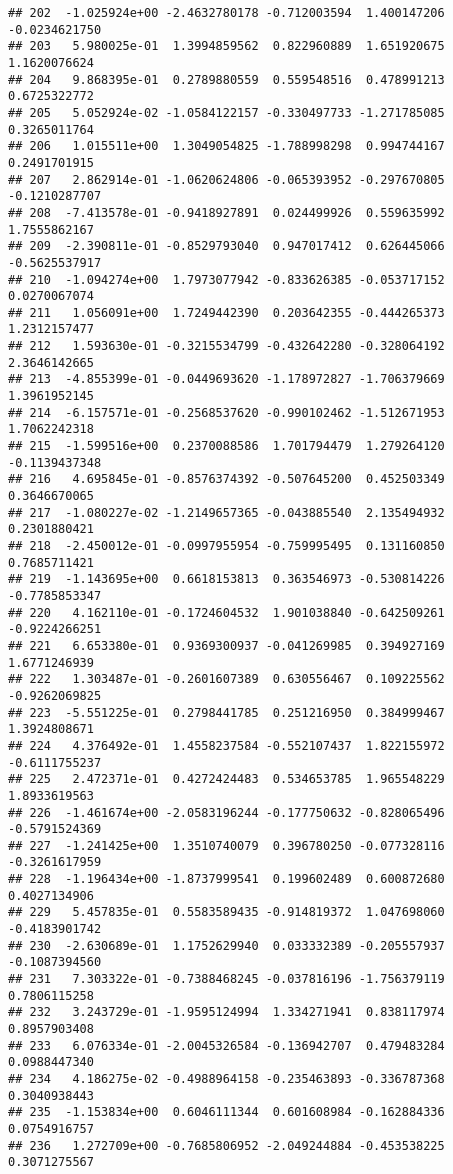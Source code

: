 \documentclass[
]{article}
\begin{document}
\begin{verbatim}
## 202  -1.025924e+00 -2.4632780178 -0.712003594  1.400147206 -0.0234621750
## 203   5.980025e-01  1.3994859562  0.822960889  1.651920675  1.1620076624
## 204   9.868395e-01  0.2789880559  0.559548516  0.478991213  0.6725322772
## 205   5.052924e-02 -1.0584122157 -0.330497733 -1.271785085  0.3265011764
## 206   1.015511e+00  1.3049054825 -1.788998298  0.994744167  0.2491701915
## 207   2.862914e-01 -1.0620624806 -0.065393952 -0.297670805 -0.1210287707
## 208  -7.413578e-01 -0.9418927891  0.024499926  0.559635992  1.7555862167
## 209  -2.390811e-01 -0.8529793040  0.947017412  0.626445066 -0.5625537917
## 210  -1.094274e+00  1.7973077942 -0.833626385 -0.053717152  0.0270067074
## 211   1.056091e+00  1.7249442390  0.203642355 -0.444265373  1.2312157477
## 212   1.593630e-01 -0.3215534799 -0.432642280 -0.328064192  2.3646142665
## 213  -4.855399e-01 -0.0449693620 -1.178972827 -1.706379669  1.3961952145
## 214  -6.157571e-01 -0.2568537620 -0.990102462 -1.512671953  1.7062242318
## 215  -1.599516e+00  0.2370088586  1.701794479  1.279264120 -0.1139437348
## 216   4.695845e-01 -0.8576374392 -0.507645200  0.452503349  0.3646670065
## 217  -1.080227e-02 -1.2149657365 -0.043885540  2.135494932  0.2301880421
## 218  -2.450012e-01 -0.0997955954 -0.759995495  0.131160850  0.7685711421
## 219  -1.143695e+00  0.6618153813  0.363546973 -0.530814226 -0.7785853347
## 220   4.162110e-01 -0.1724604532  1.901038840 -0.642509261 -0.9224266251
## 221   6.653380e-01  0.9369300937 -0.041269985  0.394927169  1.6771246939
## 222   1.303487e-01 -0.2601607389  0.630556467  0.109225562 -0.9262069825
## 223  -5.551225e-01  0.2798441785  0.251216950  0.384999467  1.3924808671
## 224   4.376492e-01  1.4558237584 -0.552107437  1.822155972 -0.6111755237
## 225   2.472371e-01  0.4272424483  0.534653785  1.965548229  1.8933619563
## 226  -1.461674e+00 -2.0583196244 -0.177750632 -0.828065496 -0.5791524369
## 227  -1.241425e+00  1.3510740079  0.396780250 -0.077328116 -0.3261617959
## 228  -1.196434e+00 -1.8737999541  0.199602489  0.600872680  0.4027134906
## 229   5.457835e-01  0.5583589435 -0.914819372  1.047698060 -0.4183901742
## 230  -2.630689e-01  1.1752629940  0.033332389 -0.205557937 -0.1087394560
## 231   7.303322e-01 -0.7388468245 -0.037816196 -1.756379119  0.7806115258
## 232   3.243729e-01 -1.9595124994  1.334271941  0.838117974  0.8957903408
## 233   6.076334e-01 -2.0045326584 -0.136942707  0.479483284  0.0988447340
## 234   4.186275e-02 -0.4988964158 -0.235463893 -0.336787368  0.3040938443
## 235  -1.153834e+00  0.6046111344  0.601608984 -0.162884336  0.0754916757
## 236   1.272709e+00 -0.7685806952 -2.049244884 -0.453538225  0.3071275567

\end{verbatim}
\end{document}

